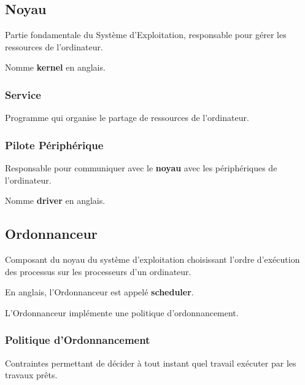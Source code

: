 \documentclass{article}
\begin{document}
\subsection{Noyau}
\begin{definition}
    Partie fondamentale du Système d'Exploitation, responsable pour gérer les ressources de l'ordinateur.    
    
    \begin{remark}
        Nomme \textbf{kernel} en anglais.
    \end{remark}
\end{definition}

\subsubsection{Service}
\begin{definition}
    Programme qui organise le partage de ressources de l'ordinateur.
\end{definition}

\subsubsection{Pilote Périphérique}
\begin{definition}
    Responsable pour communiquer avec le \textbf{noyau} avec les périphériques de l'ordinateur.    
    
    \begin{remark}
        Nomme \textbf{driver} en anglais.
    \end{remark}
\end{definition}


\subsection{Ordonnanceur}
\begin{definition}
    Composant du noyau du système d'exploitation choisissant l'ordre d'exécution des processus sur les processeurs d'un ordinateur.
    
    \begin{remark}
        En anglais, l'Ordonnanceur est appelé \textbf{scheduler}.
    \end{remark}
    L'Ordonnanceur implémente une politique d'ordonnancement.
\end{definition}

\subsubsection{Politique d'Ordonnancement}
\begin{definition}
    Contraintes permettant de décider à tout instant quel travail exécuter par les travaux prêts.
\end{definition}
\end{document}
